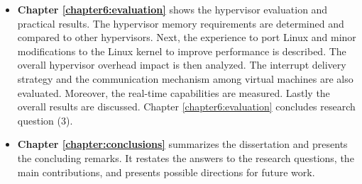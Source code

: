 \begin{itemize}
\item \textbf{Chapter \ref{chapter6:evaluation}} shows the hypervisor evaluation and practical results. The hypervisor memory requirements are determined and compared to other hypervisors. Next, the experience to port Linux and minor modifications to the Linux kernel to improve performance is described. The overall hypervisor overhead impact is then analyzed. The interrupt delivery strategy and the communication mechanism among virtual machines are also evaluated. Moreover, the real-time capabilities are measured. Lastly the overall results are discussed.  Chapter \ref{chapter6:evaluation} concludes research question (3).

\item \textbf{Chapter \ref{chapter:conclusions}} summarizes the dissertation and presents the concluding remarks. It restates the answers to the research questions, the main contributions, and presents possible directions for future work.
\end{itemize}